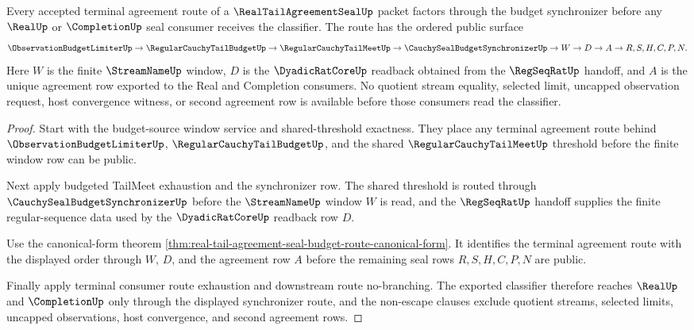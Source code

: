 \begin{theorem}
\label{thm:real-tail-agreement-seal-budget-synchronizer-factorization}
Every accepted terminal agreement route of a $\RealTailAgreementSealUp$ packet factors through the budget synchronizer before any $\RealUp$ or $\CompletionUp$ seal consumer receives the classifier. The route has the ordered public surface
$$
\ObservationBudgetLimiterUp \to \RegularCauchyTailBudgetUp \to \RegularCauchyTailMeetUp \to \CauchySealBudgetSynchronizerUp \to W \to D \to A \to R,S,H,C,P,N.
$$
Here $W$ is the finite $\StreamNameUp$ window, $D$ is the $\DyadicRatCoreUp$ readback obtained from the $\RegSeqRatUp$ handoff, and $A$ is the unique agreement row exported to the Real and Completion consumers. No quotient stream equality, selected limit, uncapped observation request, host convergence witness, or second agreement row is available before those consumers read the classifier.
\end{theorem}
\begin{proof}
Start with the budget-source window service and shared-threshold exactness. They place any terminal agreement route behind $\ObservationBudgetLimiterUp$, $\RegularCauchyTailBudgetUp$, and the shared $\RegularCauchyTailMeetUp$ threshold before the finite window row can be public.

Next apply budgeted TailMeet exhaustion and the synchronizer row. The shared threshold is routed through $\CauchySealBudgetSynchronizerUp$ before the $\StreamNameUp$ window $W$ is read, and the $\RegSeqRatUp$ handoff supplies the finite regular-sequence data used by the $\DyadicRatCoreUp$ readback row $D$.

Use the canonical-form theorem \autoref{thm:real-tail-agreement-seal-budget-route-canonical-form}. It identifies the terminal agreement route with the displayed order through $W$, $D$, and the agreement row $A$ before the remaining seal rows $R,S,H,C,P,N$ are public.

Finally apply terminal consumer route exhaustion and downstream route no-branching. The exported classifier therefore reaches $\RealUp$ and $\CompletionUp$ only through the displayed synchronizer route, and the non-escape clauses exclude quotient streams, selected limits, uncapped observations, host convergence, and second agreement rows.
\end{proof}

